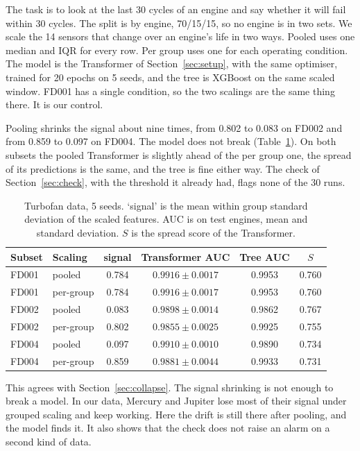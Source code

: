 \documentclass[preprint,12pt,authoryear,doubleblind]{elsarticle}
\begin{document}
The task is to look at the last 30 cycles of an engine and say whether it will fail within 30 cycles. The split is by engine, 70/15/15, so no engine is in two sets. We scale the 14 sensors that change over an engine's life in two ways. Pooled uses one median and IQR for every row. Per group uses one for each operating condition. The model is the Transformer of Section~\ref{sec:setup}, with the same optimiser, trained for 20 epochs on 5 seeds, and the tree is XGBoost on the same scaled window. FD001 has a single condition, so the two scalings are the same thing there. It is our control.

Pooling shrinks the signal about nine times, from 0.802 to 0.083 on FD002 and from 0.859 to 0.097 on FD004. The model does not break (Table~\ref{tab:cmapss}). On both subsets the pooled Transformer is slightly ahead of the per group one, the spread of its predictions is the same, and the tree is fine either way. The check of Section~\ref{sec:check}, with the threshold it already had, flags none of the 30 runs.

\begin{table}[t]
\centering
\caption{Turbofan data, 5 seeds. `signal' is the mean within group standard deviation of the scaled features. AUC is on test engines, mean and standard deviation. $S$ is the spread score of the Transformer.}
\label{tab:cmapss}
\footnotesize
\setlength{\tabcolsep}{4pt}
\begin{tabular}{@{}llcccc@{}}
\toprule
Subset & Scaling & signal & Transformer AUC & Tree AUC & $S$ \\
\midrule
FD001 & pooled & 0.784 & $0.9916 \pm 0.0017$ & 0.9953 & 0.760 \\
FD001 & per-group & 0.784 & $0.9916 \pm 0.0017$ & 0.9953 & 0.760 \\
FD002 & pooled & 0.083 & $0.9898 \pm 0.0014$ & 0.9862 & 0.767 \\
FD002 & per-group & 0.802 & $0.9855 \pm 0.0025$ & 0.9925 & 0.755 \\
FD004 & pooled & 0.097 & $0.9910 \pm 0.0010$ & 0.9890 & 0.734 \\
FD004 & per-group & 0.859 & $0.9881 \pm 0.0044$ & 0.9933 & 0.731 \\
\bottomrule
\end{tabular}
\end{table}

This agrees with Section~\ref{sec:collapse}. The signal shrinking is not enough to break a model. In our data, Mercury and Jupiter lose most of their signal under grouped scaling and keep working. Here the drift is still there after pooling, and the model finds it. It also shows that the check does not raise an alarm on a second kind of data.
\end{document}

